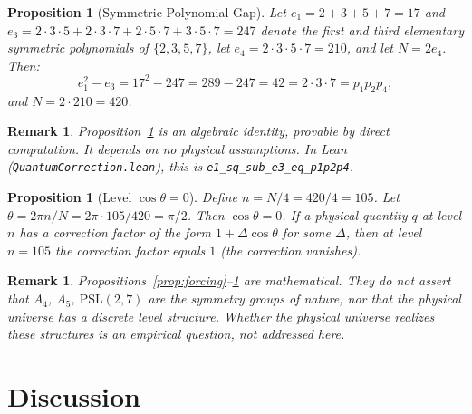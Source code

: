 ﻿\documentclass[11pt]{article}
\newtheorem{proposition}[theorem]{Proposition}
\newtheorem{remark}[theorem]{Remark}
\begin{document}
\begin{proposition}[Symmetric Polynomial Gap]
\label{prop:gap}
Let $e_1 = 2+3+5+7 = 17$ and $e_3 = 2 \cdot 3 \cdot 5
+ 2 \cdot 3 \cdot 7 + 2 \cdot 5 \cdot 7 + 3 \cdot 5 \cdot 7
= 247$ denote the first and third elementary symmetric
polynomials of $\{2,3,5,7\}$, let $e_4 = 2 \cdot 3 \cdot
5 \cdot 7 = 210$, and let $N = 2 e_4$. Then:
\[
e_1^2 - e_3 = 17^2 - 247 = 289 - 247 = 42
= 2 \cdot 3 \cdot 7 = p_1 p_2 p_4,
\]
and $N = 2 \cdot 210 = 420$.
\end{proposition}

\begin{remark}
Proposition~\ref{prop:gap} is an algebraic identity,
provable by direct computation. It depends on no physical
assumptions. In Lean (\texttt{QuantumCorrection.lean}),
this is \texttt{e1\_sq\_sub\_e3\_eq\_p1p2p4}.
\end{remark}

\begin{proposition}[Level $\cos\theta = 0$]
\label{prop:cos}
Define $n = N/4 = 420/4 = 105$. Let $\theta = 2\pi n / N
= 2\pi \cdot 105 / 420 = \pi/2$. Then $\cos\theta = 0$.
If a physical quantity $q$ at level $n$ has a correction
factor of the form $1 + \Delta \cos\theta$ for some
$\Delta$, then at level $n = 105$ the correction factor
equals $1$ (the correction vanishes).
\end{proposition}

\begin{remark}
Propositions~\ref{prop:forcing}--\ref{prop:cos} are
mathematical. They do not assert that $A_4$, $A_5$,
$\mathrm{PSL}(2,7)$ are the symmetry groups of nature,
nor that the physical universe has a discrete level
structure. Whether the physical universe realizes these
structures is an empirical question, not addressed here.
\end{remark}

\section{Discussion}
\label{sec:discussion}
\end{document}

